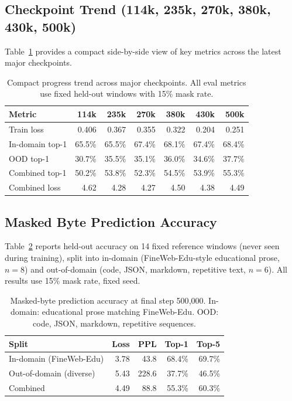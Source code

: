 \documentclass[10pt,twocolumn]{article}
\begin{document}
\subsection{Checkpoint Trend (114k, 235k, 270k, 380k, 430k, 500k)}

Table~\ref{tab:trend} provides a compact side-by-side view of key
metrics across the latest major checkpoints.

\begin{table}[h]
\centering
\caption{Compact progress trend across major checkpoints.
All eval metrics use fixed held-out windows with 15\% mask rate.}
\label{tab:trend}
\begin{tabular}{lrrrrrr}
\toprule
Metric & 114k & 235k & 270k & 380k & 430k & 500k \\
\midrule
Train loss & 0.406 & 0.367 & 0.355 & 0.322 & 0.204 & 0.251 \\
In-domain top-1 & 65.5\% & 65.5\% & 67.4\% & 68.1\% & 67.4\% & 68.4\% \\
OOD top-1 & 30.7\% & 35.5\% & 35.1\% & 36.0\% & 34.6\% & 37.7\% \\
Combined top-1 & 50.2\% & 53.8\% & 52.3\% & 54.5\% & 53.9\% & 55.3\% \\
Combined loss & 4.62 & 4.28 & 4.27 & 4.50 & 4.38 & 4.49 \\
\bottomrule
\end{tabular}
\end{table}

\subsection{Masked Byte Prediction Accuracy}

Table~\ref{tab:eval} reports held-out accuracy on 14 fixed reference
windows (never seen during training), split into in-domain
(FineWeb-Edu-style educational prose, $n{=}8$) and out-of-domain
(code, JSON, markdown, repetitive text, $n{=}6$).
All results use 15\% mask rate, fixed seed.

\begin{table}[h]
\centering
\caption{Masked-byte prediction accuracy at final step 500{,}000.
In-domain: educational prose matching FineWeb-Edu.
OOD: code, JSON, markdown, repetitive sequences.}
\label{tab:eval}
\begin{tabular}{lrrrr}
\toprule
Split & Loss & PPL & Top-1 & Top-5 \\
\midrule
In-domain (FineWeb-Edu) & 3.78 & 43.8 & 68.4\% & 69.7\% \\
Out-of-domain (diverse) & 5.43 & 228.6 & 37.7\% & 46.5\% \\
\midrule
Combined & 4.49 & 88.8 & 55.3\% & 60.3\% \\
\bottomrule
\end{tabular}
\end{table}
\end{document}
